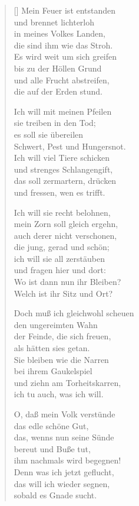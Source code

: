 \begin{multicols}{2}
\begin{verse}[\versewidth]
 Mein Feuer ist entstanden\\
und brennet lichterloh\\
in meines Volkes Landen,\\
die sind ihm wie das Stroh.\\
Es wird weit um sich greifen\\
bis zu der Höllen Grund\\
und alle Frucht abstreifen,\\
die auf der Erden stund.

 Ich will mit meinen Pfeilen\\
sie treiben in den Tod;\\
es soll sie übereilen\\
Schwert, Pest und Hungersnot.\\
Ich will viel Tiere schicken\\
und strenges Schlangengift,\\
das soll zermartern, drücken\\
und fressen, wen es trifft.

 Ich will sie recht belohnen,\\
mein Zorn soll gleich ergehn,\\
auch derer nicht verschonen,\\
die jung, gerad und schön;\\
ich will sie all zerstäuben\\
und fragen hier und dort:\\
Wo ist dann nun ihr Bleiben?\\
Welch ist ihr Sitz und Ort?

 Doch muß ich gleichwohl scheuen\\
den ungereimten Wahn\\
der Feinde, die sich freuen,\\
als hätten sies getan.\\
Sie bleiben wie die Narren\\
bei ihrem Gaukelspiel\\
und ziehn am Torheitskarren,\\
ich tu auch, was ich will.

 O, daß mein Volk verstünde\\
das edle schöne Gut,\\
das, wenns nun seine Sünde\\
bereut und Buße tut,\\
ihm nachmals wird begegnen!\\
Denn was ich jetzt geflucht,\\
das will ich wieder segnen,\\
sobald es Gnade sucht.


\end{verse}
\end{multicols}
